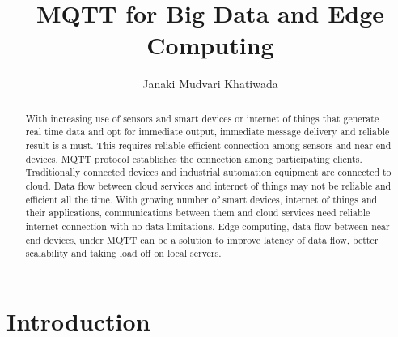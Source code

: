 \documentclass[sigconf]{acmart}
\begin{document}
\title{MQTT for Big Data and Edge Computing}


\author{Janaki Mudvari Khatiwada}




\renewcommand{\shortauthors}{G. v. Laszewski}


\begin{abstract}
With increasing use of sensors and smart devices or internet of things that generate real time data and opt for immediate output, immediate message delivery and reliable result is a must. This requires reliable efficient connection among sensors and near end devices. MQTT protocol  establishes the connection among participating clients. Traditionally connected  devices and industrial automation equipment are  connected to cloud. Data flow between cloud services and internet of things may not be reliable and efficient all the time. With growing number of smart devices, internet of things and their applications, communications between them and cloud services need reliable internet connection with no data limitations. Edge computing, data flow between near end devices, under MQTT can be a solution to improve latency of data flow,  better scalability and taking load off on local servers.
\end{abstract}



\maketitle



\section{Introduction}
\end{document}
